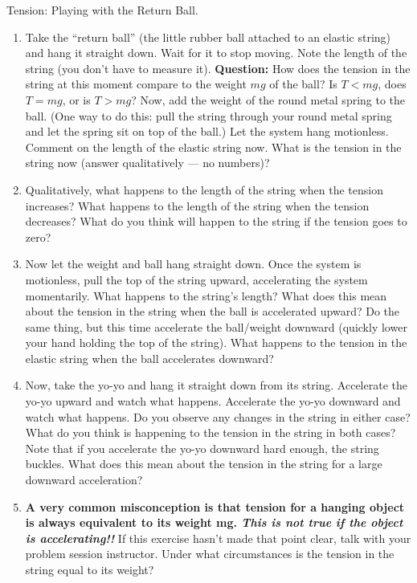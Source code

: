 \begin{aproblem}{Tension: Playing with the Return Ball.}
  \begin{enumerate}
  \item Take the ``return ball'' (the little rubber ball attached to
    an elastic string) and hang it straight down.  Wait for it to stop
    moving.  Note the length of the string (you don't have to measure
    it).  {\bf Question:} How does the tension in the string at this
    moment compare to the weight $mg$ of the ball?  Is $T < mg$, does
    $T =mg$, or is $T> mg$?  Now, add the weight of the round metal
    spring to the ball.  (One way to do this: pull the string through
    your round metal spring and let the spring sit on top of the
    ball.)  Let the system hang motionless.  Comment on the length of
    the elastic string now.  What is the tension in the string now
    (answer qualitatively --- no numbers)?

  \item Qualitatively, what happens to the length of the string when
    the tension increases?  What happens to the length of the string
    when the tension decreases?  What do you think will happen to the
    string if the tension goes to zero?

  \item Now let the weight and ball hang straight down.  Once the
    system is motionless, pull the top of the string upward,
    accelerating the system momentarily.  What happens to the string's
    length?  What does this mean about the tension in the string when
    the ball is accelerated upward?  Do the same thing, but this time
    accelerate the ball/weight downward (quickly lower your hand
    holding the top of the string).  What happens to the tension in
    the elastic string when the ball accelerates downward?

  \item Now, take the yo-yo and hang it straight down from its string.
    Accelerate the yo-yo upward and watch what happens.  Accelerate
    the yo-yo downward and watch what happens.  Do you observe any
    changes in the string in either case?  What do you think is
    happening to the tension in the string in both cases?  Note that
    if you accelerate the yo-yo downward hard enough, the string
    buckles.  What does this mean about the tension in the string for
    a large downward acceleration?

  \item {\bf A very common misconception is that tension for a hanging
      object is always equivalent to its weight mg.  {\em This is not
        true if the object is accelerating!!}}  If this exercise
    hasn't made that point clear, talk with your problem session
    instructor.  Under what circumstances is the tension in the string
    equal to its weight?

  \end{enumerate}
  \label{prob:return_ball}
\end{aproblem}

